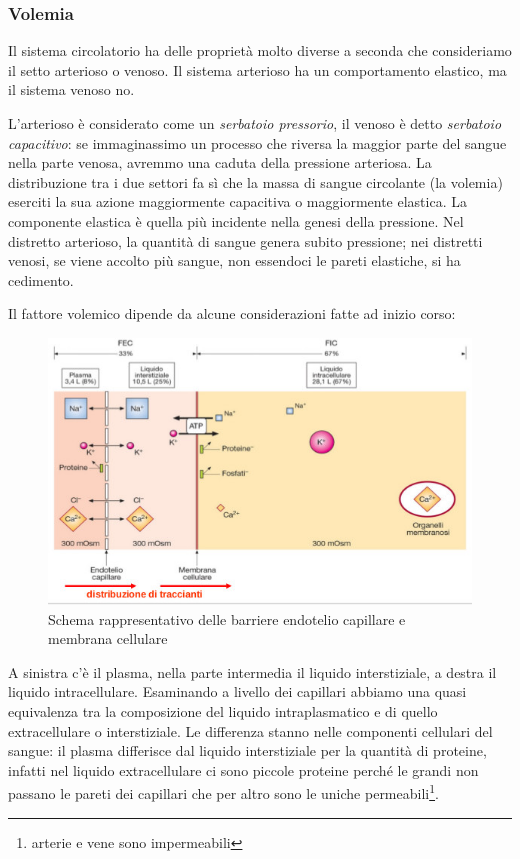 \documentclass[a4paper,12pt]{article}
\begin{document}
\subsubsection{Volemia}
Il sistema circolatorio ha delle proprietà molto diverse a seconda che consideriamo il setto arterioso o venoso. Il sistema arterioso ha un comportamento elastico, ma il sistema venoso no. 

L'arterioso è considerato come un \emph{serbatoio pressorio}, il venoso è detto \emph{serbatoio capacitivo}: se immaginassimo un processo che riversa la maggior parte del sangue nella parte venosa, avremmo una caduta della pressione arteriosa. La distribuzione tra i due settori fa sì che la massa di sangue circolante (la volemia) eserciti la sua azione maggiormente capacitiva o maggiormente elastica. La componente elastica è quella più incidente nella genesi della pressione. Nel distretto arterioso, la quantità di sangue genera subito pressione; nei distretti venosi, se viene accolto più sangue, non essendoci le pareti elastiche, si ha cedimento. 

Il fattore volemico dipende da alcune considerazioni fatte ad inizio corso: 
\begin{figure}[H]
\centering
\includegraphics[scale=0.5]{immagine/endotelio.jpg}
\caption{Schema rappresentativo delle barriere endotelio capillare e membrana cellulare}
\label{img:endo}
\end{figure}
A sinistra c'è il plasma, nella parte intermedia il liquido interstiziale, a destra il liquido intracellulare. Esaminando a livello dei capillari abbiamo una quasi equivalenza tra la composizione del liquido intraplasmatico e di quello extracellulare o interstiziale. Le differenza stanno nelle componenti cellulari del sangue: il plasma differisce dal liquido interstiziale per la quantità di proteine, infatti nel liquido extracellulare ci sono piccole proteine perché le grandi non passano le pareti dei capillari che per altro sono le uniche permeabili\footnote{arterie e vene sono impermeabili}. 
\end{document}

